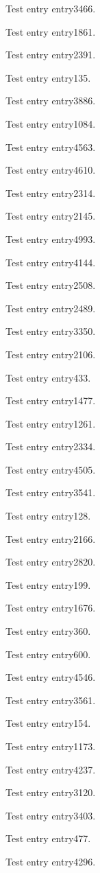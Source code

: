 Test entry \gls{entry3466}.

Test entry \gls{entry1861}.

Test entry \gls{entry2391}.

Test entry \gls{entry135}.

Test entry \gls{entry3886}.

Test entry \gls{entry1084}.

Test entry \gls{entry4563}.

Test entry \gls{entry4610}.

Test entry \gls{entry2314}.

Test entry \gls{entry2145}.

Test entry \gls{entry4993}.

Test entry \gls{entry4144}.

Test entry \gls{entry2508}.

Test entry \gls{entry2489}.

Test entry \gls{entry3350}.

Test entry \gls{entry2106}.

Test entry \gls{entry433}.

Test entry \gls{entry1477}.

Test entry \gls{entry1261}.

Test entry \gls{entry2334}.

Test entry \gls{entry4505}.

Test entry \gls{entry3541}.

Test entry \gls{entry128}.

Test entry \gls{entry2166}.

Test entry \gls{entry2820}.

Test entry \gls{entry199}.

Test entry \gls{entry1676}.

Test entry \gls{entry360}.

Test entry \gls{entry600}.

Test entry \gls{entry4546}.

Test entry \gls{entry3561}.

Test entry \gls{entry154}.

Test entry \gls{entry1173}.

Test entry \gls{entry4237}.

Test entry \gls{entry3120}.

Test entry \gls{entry3403}.

Test entry \gls{entry477}.

Test entry \gls{entry4296}.

